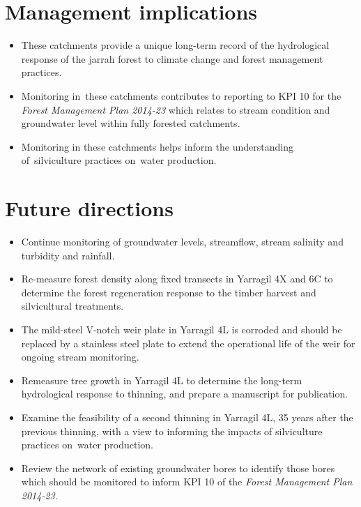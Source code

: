\documentclass[version=last,
    paper=a4, %
    10pt, %
    usenames,
    dvipsnames,
    oneside, %
    headings=openany, %
    DIV=15 %
]{scrbook}
\begin{document}
\section*{Management implications}
\begin{itemize}
\itemsep1pt\parskip0pt
\item
  These catchments provide a unique long-term record of the hydrological
  response of the jarrah forest to climate change and forest management
  practices.
\item
  Monitoring in~these catchments contributes to reporting to KPI 10 for
  the \emph{Forest Management Plan 2014-23} which relates to stream
  condition and groundwater level within fully forested catchments.
\item
  Monitoring in these catchments helps inform the understanding
  of~silviculture practices on~water production.
\end{itemize}



\section*{Future directions}
\begin{itemize}
\itemsep1pt\parskip0pt
\item
  Continue monitoring of groundwater levels, streamflow, stream salinity
  and turbidity and rainfall.
\item
  Re-measure forest density along fixed transects in Yarragil 4X and 6C
  to determine the forest regeneration response to the timber harvest
  and silvicultural treatments.
\item
  The mild-steel V-notch weir plate in Yarragil 4L is corroded and
  should be replaced by a stainless steel plate to extend the
  operational life of the weir for ongoing stream monitoring.
\item
  Remeasure tree growth in Yarragil 4L to determine the long-term
  hydrological response to thinning, and prepare a manuscript for
  publication.
\item
  Examine the feasibility of a second thinning in Yarragil 4L, 35 years
  after the previous thinning, with a view to informing the impacts of
  silviculture practices on~water production.
\item
  Review the network of existing groundwater bores to identify those
  bores which should be monitored to inform KPI 10 of the \emph{Forest
  Management Plan 2014-23}.
\end{itemize}



\end{document}
